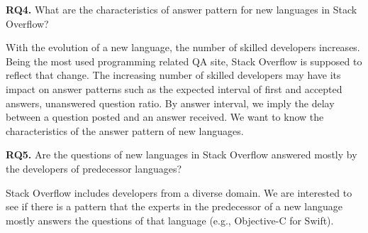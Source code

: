 \noindent  \textbf{RQ4.} What are the characteristics of answer pattern for new languages in Stack Overflow?

\indent With the evolution of a new language, the number of skilled developers increases. Being the most used programming related QA site, Stack Overflow is supposed to reflect that change. The increasing number of skilled developers may have its impact on answer patterns such as the expected interval of first and accepted answers, unanswered question ratio. By answer interval, we imply the delay between a question posted and an answer received. We want to know the characteristics of the answer pattern of new languages.

\noindent  \textbf{RQ5.} Are the questions of new languages in Stack Overflow answered mostly by the developers of predecessor languages?

\indent Stack Overflow includes developers from a diverse domain. We are interested to see if there is a pattern that the experts in the predecessor of a new language mostly answers the questions of that language (e.g., Objective-C for Swift).

\iffalse


\noindent  \textbf{RQ6.} Is there any change over time in topics of Stack Overflow questions with the growth of the relevant language?

\indent Evolution of a language has many phases. These phases must have their footprint in the topics of the questions asked by the developers of the new languages. Hence, we want to know the topics of the questions asked by developers with respect to a timeline so that we can identify those phases.

\noindent \textbf{RQ7:} \emph{How do developers respond to the release of a new version of a language?}

\indent A new release of a language comes with a new and updated feature set. These updated or new features must have some impact over developer community. It may trigger new thread of question in Stack Overflow. We want to know the after effect of such release.
\fi
